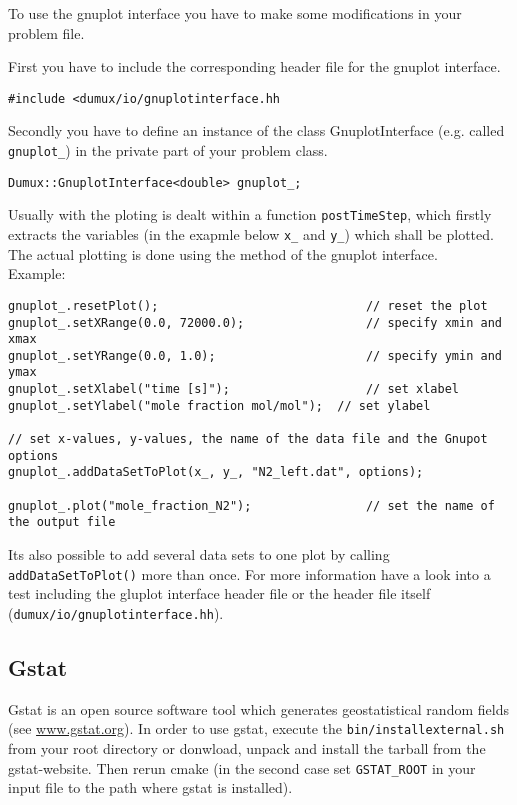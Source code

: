 To use the gnuplot interface you have to make some modifications in your problem file.

First you have to include the corresponding header file for the gnuplot interface. 
\begin{lstlisting}[style=DumuxCode]
#include <dumux/io/gnuplotinterface.hh
\end{lstlisting}

Secondly you have to define an instance of the class GnuplotInterface (e.g. called \texttt{gnuplot\_}) in the private part of your problem class.
\begin{lstlisting}[style=DumuxCode]
Dumux::GnuplotInterface<double> gnuplot_;
\end{lstlisting}

Usually with the ploting is dealt within a function \texttt{postTimeStep}, which firstly extracts the variables (in the exapmle below \texttt{x\_} and \texttt{y\_}) which shall be plotted. The actual plotting is done using the method of the gnuplot interface.\\

Example:
\begin{lstlisting}[style=DumuxCode]
gnuplot_.resetPlot();                             // reset the plot
gnuplot_.setXRange(0.0, 72000.0);                 // specify xmin and xmax  
gnuplot_.setYRange(0.0, 1.0);                     // specify ymin and ymax
gnuplot_.setXlabel("time [s]");                   // set xlabel
gnuplot_.setYlabel("mole fraction mol/mol");  // set ylabel

// set x-values, y-values, the name of the data file and the Gnupot options
gnuplot_.addDataSetToPlot(x_, y_, "N2_left.dat", options); 

gnuplot_.plot("mole_fraction_N2");                // set the name of the output file
\end{lstlisting}

Its also possible to add several data sets to one plot by calling \texttt{addDataSetToPlot()} more than once.
For more information have a look into a test including the gluplot interface header file or
the header file itself (\texttt{dumux/io/gnuplotinterface.hh}).


\subsection{Gstat}
Gstat is an open source software tool which generates geostatistical random fields (see \url{www.gstat.org}).
In order to use gstat, execute the \texttt{bin/installexternal.sh} from your \Dumux root
directory or donwload, unpack and install the tarball from the gstat-website.
Then rerun cmake (in the second case set \texttt{GSTAT\_ROOT} in your input file to the
path where gstat is installed).


